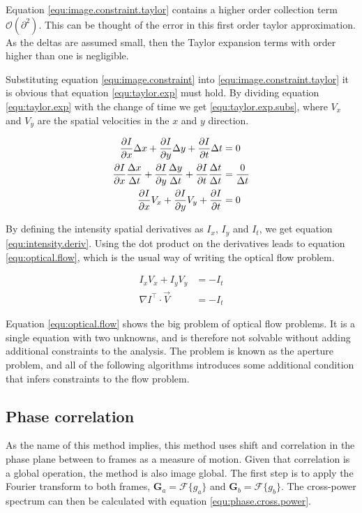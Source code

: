 Equation \eqref{equ:image.constraint.taylor} contains a higher order collection term $\mathcal{O}(\partial^2)$. This can be thought of the error in this first order taylor approximation. As
the deltas are assumed small, then the Taylor expansion terms with order higher than one is negligible. 

Substituting equation \eqref{equ:image.constraint} into \eqref{equ:image.constraint.taylor} it is obvious that equation \eqref{equ:taylor.exp} must hold. 
By dividing equation \eqref{equ:taylor.exp} with the change of time we get \eqref{equ:taylor.exp.subs}, where $V_x$ and $V_y$ are the spatial velocities in the 
$x$ and $y$ direction.

\begin{align}
	\frac{\partial I}{\partial x} \Delta x + \frac{\partial I}{\partial y} \Delta y + 
		\frac{\partial I}{\partial t} \Delta t &= 0 \label{equ:taylor.exp} \\
	\frac{\partial I}{\partial x} \frac{\Delta x}{\Delta t} + \frac{\partial I}{\partial y} \frac{\Delta y}{\Delta t} + 
		\frac{\partial I}{\partial t} \frac{\Delta t}{\Delta t} &= \frac{0}{\Delta t} \notag \\
	\frac{\partial I}{\partial x} V_x + \frac{\partial I}{\partial y} V_y + \frac{\partial I}{\partial t}  &= 0 \label{equ:taylor.exp.subs}
\end{align}

By defining the intensity spatial derivatives as $I_x$, $I_y$ and $I_t$, we get equation \eqref{equ:intensity.deriv}. Using the dot product on the derivatives 
leads to equation \eqref{equ:optical.flow}, which is the usual way of writing the optical flow problem.

\begin{align}
	I_x V_x + I_y V_y &= -I_t \label{equ:intensity.deriv} \\
	\nabla I^\top \cdot \vec{V} &= -I_t \label{equ:optical.flow}
\end{align}

Equation \eqref{equ:optical.flow} shows the big problem of optical flow problems. It is a single equation with two unknowns, and is therefore not 
solvable without adding additional constraints to the analysis. The problem is known as the aperture problem, and all of the following algorithms 
introduces some additional condition that infers constraints to the flow problem.

\subsection{Phase correlation}\label{sec:phase.correlation}
As the name of this method implies, this method uses shift and correlation in the phase plane between to frames as a measure of motion. Given that correlation is a global operation,
the method is also image global. The first step is to apply the Fourier transform to both frames, $\textbf{G}_a = \mathcal{F}\{g_a\}$ and $\textbf{G}_b = \mathcal{F}\{g_b\}$. The cross-power spectrum 
can then be calculated with equation \eqref{equ:phase.cross.power}.

